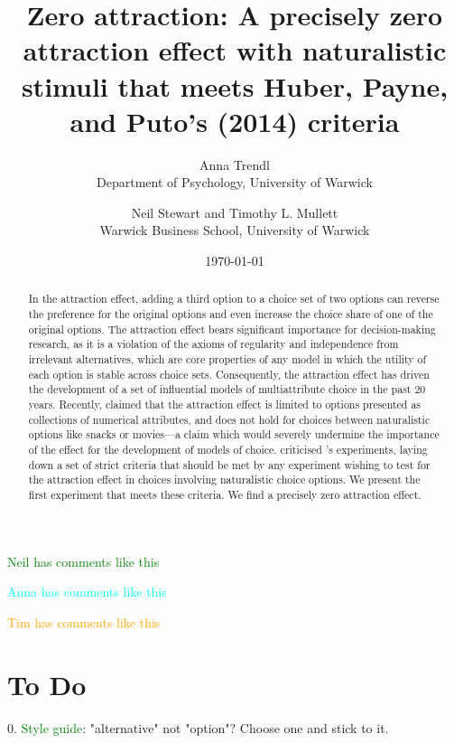 \documentclass[12pt, a4paper]{article}
\title{}
\author{}
\date{}
\title{Zero attraction: A precisely zero attraction effect with naturalistic stimuli that meets Huber, Payne, and Puto's (2014) criteria}
\author{Anna Trendl\\Department of Psychology, University of Warwick \and Neil Stewart and Timothy L. Mullett\\Warwick Business School, University of Warwick}
\date{\today}
\newcommand{\NS}[1] {{\textcolor{green}{#1}}}
\newcommand{\AT}[1] {{\textcolor{cyan}{#1}}}
\newcommand{\TM}[1] {{\textcolor{orange}{#1}}}
\begin{document}
\begin{titlepage}
\maketitle

\newpage

\begin{abstract}
In the attraction effect, adding a third option to a choice set of two options can reverse the preference for the original options and even increase the choice share of one of the original options. The attraction effect bears significant importance for decision-making research, as it is a violation of the axioms of regularity and independence from irrelevant alternatives, which are core properties of any model in which the utility of each option is stable across choice sets. Consequently, the attraction effect has driven the development of a set of influential models of multiattribute choice in the past 20 years. Recently,  claimed that the attraction effect is limited to options presented as collections of numerical attributes, and does not hold for choices between naturalistic options like snacks or movies---a claim which would severely undermine the importance of the effect for the development of models of choice.  criticised \citeauthor{Frederick2014}'s experiments, laying down a set of strict criteria that should be met by any experiment wishing to test for the attraction effect in choices involving naturalistic choice options. We present the first experiment that meets these criteria. We find a precisely zero attraction effect.
\end{abstract}
\end{titlepage}

\NS{Neil has comments like this}

\AT{Anna has comments like this}

\TM{Tim has comments like this}


\section{To Do}

0. \NS{Style guide}: "alternative" not "option"? Choose one and stick to it.
\end{document}
